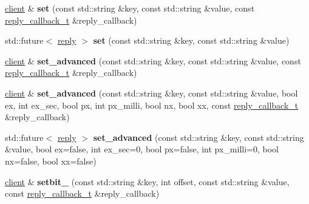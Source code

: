 \begin{DoxyCompactItemize}
\item 
\mbox{\label{classcpp__redis_1_1client_a6d654139ca804e9ee2ac0d0683878ece}} 
\hyperlink{classcpp__redis_1_1client}{client} \& {\bfseries set} (const std\+::string \&key, const std\+::string \&value, const \hyperlink{classcpp__redis_1_1client_a061a1140d36d2eaeda82b09a0bb3f9f2}{reply\+\_\+callback\+\_\+t} \&reply\+\_\+callback)
\item 
\mbox{\label{classcpp__redis_1_1client_a734ba95a7e2083fe6bc2e209f94ccab6}} 
std\+::future$<$ \hyperlink{classcpp__redis_1_1reply}{reply} $>$ {\bfseries set} (const std\+::string \&key, const std\+::string \&value)
\item 
\mbox{\label{classcpp__redis_1_1client_aac03b242d1a0948a9eb3567624e72622}} 
\hyperlink{classcpp__redis_1_1client}{client} \& {\bfseries set\+\_\+advanced} (const std\+::string \&key, const std\+::string \&value, const \hyperlink{classcpp__redis_1_1client_a061a1140d36d2eaeda82b09a0bb3f9f2}{reply\+\_\+callback\+\_\+t} \&reply\+\_\+callback)
\item 
\mbox{\label{classcpp__redis_1_1client_a60db35e46bcbe36e5264ee04933162fd}} 
\hyperlink{classcpp__redis_1_1client}{client} \& {\bfseries set\+\_\+advanced} (const std\+::string \&key, const std\+::string \&value, bool ex, int ex\+\_\+sec, bool px, int px\+\_\+milli, bool nx, bool xx, const \hyperlink{classcpp__redis_1_1client_a061a1140d36d2eaeda82b09a0bb3f9f2}{reply\+\_\+callback\+\_\+t} \&reply\+\_\+callback)
\item 
\mbox{\label{classcpp__redis_1_1client_a208688fdc336009701256722ef7e2a2b}} 
std\+::future$<$ \hyperlink{classcpp__redis_1_1reply}{reply} $>$ {\bfseries set\+\_\+advanced} (const std\+::string \&key, const std\+::string \&value, bool ex=false, int ex\+\_\+sec=0, bool px=false, int px\+\_\+milli=0, bool nx=false, bool xx=false)
\item 
\mbox{\label{classcpp__redis_1_1client_a17ecd647ae2e9f11e331d1254a21e0d3}} 
\hyperlink{classcpp__redis_1_1client}{client} \& {\bfseries setbit\+\_\+} (const std\+::string \&key, int offset, const std\+::string \&value, const \hyperlink{classcpp__redis_1_1client_a061a1140d36d2eaeda82b09a0bb3f9f2}{reply\+\_\+callback\+\_\+t} \&reply\+\_\+callback)

\end{DoxyCompactItemize}
